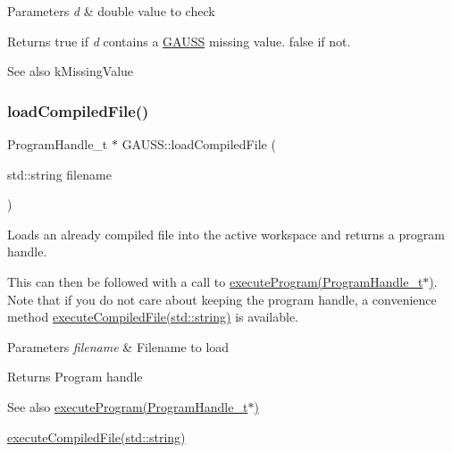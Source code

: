 \begin{DoxyParams}{Parameters}
{\em d} & double value to check \\
\hline
\end{DoxyParams}
\begin{DoxyReturn}{Returns}
true if {\itshape d} contains a \hyperlink{class_g_a_u_s_s}{G\+A\+U\+SS} missing value. false if not.
\end{DoxyReturn}
\begin{DoxySeeAlso}{See also}
k\+Missing\+Value 
\end{DoxySeeAlso}
\mbox{\label{class_g_a_u_s_s_a664d80b6f169ea22867b4a949d2fbc93}} 
\subsubsection{\texorpdfstring{load\+Compiled\+File()}{loadCompiledFile()}\hspace{0.1cm}{\footnotesize\ttfamily [1/2]}}
{\footnotesize\ttfamily Program\+Handle\+\_\+t $\ast$ G\+A\+U\+S\+S\+::load\+Compiled\+File (\begin{DoxyParamCaption}\item[{std\+::string}]{filename }\end{DoxyParamCaption})}



Loads an already compiled file into the active workspace and returns a program handle. 

This can then be followed with a call to \hyperlink{class_g_a_u_s_s_a7fc9de69421c14aadb9a6310fecabcca}{execute\+Program(\+Program\+Handle\+\_\+t$\ast$)}. Note that if you do not care about keeping the program handle, a convenience method \hyperlink{class_g_a_u_s_s_ac2624100ec1467f7c7b0626973c7e1fc}{execute\+Compiled\+File(std\+::string)} is available.


\begin{DoxyParams}{Parameters}
{\em filename} & Filename to load \\
\hline
\end{DoxyParams}
\begin{DoxyReturn}{Returns}
Program handle
\end{DoxyReturn}
\begin{DoxySeeAlso}{See also}
\hyperlink{class_g_a_u_s_s_a7fc9de69421c14aadb9a6310fecabcca}{execute\+Program(\+Program\+Handle\+\_\+t$\ast$)} 

\hyperlink{class_g_a_u_s_s_ac2624100ec1467f7c7b0626973c7e1fc}{execute\+Compiled\+File(std\+::string)} 
\end{DoxySeeAlso}
\mbox{\label{class_g_a_u_s_s_aa0e49f43968782054817936c34ca6f79}} 
